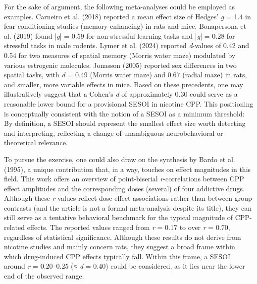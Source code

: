 \documentclass[authordate, meta]{jote-new-article}
\begin{document}
	For the sake of argument, the following meta-analyses could be employed as examples. Carneiro et al. (2018) reported a mean effect size of 	Hedges' \emph{g} = 1.4 in fear conditioning studies (memory-enhancing) in rats and mice. Bonapersona et al. (2019) found |\emph{g}| = 0.59 for non-stressful learning tasks and |\emph{g}| = 0.28 for stressful tasks in male rodents. Lymer et al. (2024) reported \emph{d}-values of 0.42 and 0.54 for two measures of spatial memory (Morris water maze) modulated by various estrogenic molecules. Jonasson (2005) reported sex differences in two spatial tasks, with \emph{d} = 0.49 (Morris water maze) and 0.67 (radial maze) in rats, and smaller, more variable effects in mice. Based on these precedents, one may illustratively suggest that a Cohen's \emph{d} of approximately 0.30 could serve as a reasonable lower bound for a provisional SESOI in nicotine CPP. This positioning is conceptually consistent with the notion of a SESOI as a minimum threshold: By definition, a SESOI should represent the smallest effect size worth detecting and interpreting, reflecting a change of unambiguous neurobehavioral or theoretical relevance.



	To pursue the exercise, one could also draw on the synthesis by Bardo et al. (1995), a unique contribution that, in a way, touches on effect magnitudes in this field. This work offers an overview of point-biserial \emph{r}-correlations between CPP effect amplitudes and the corresponding doses (several) of four addictive drugs. Although these \emph{r}-values reflect dose-effect associations rather than between-group contrasts (and the article is not a formal meta-analysis despite its title), they can still serve as a tentative behavioral benchmark for the typical magnitude of CPP-related effects. The reported values ranged from \emph{r} = 0.17 to over \emph{r} = 0.70, regardless of statistical significance. Although these results do not derive from nicotine studies and mainly concern rats, they suggest a broad frame within which drug-induced CPP effects typically fall. Within this frame, a SESOI around \emph{r} = 0.20--0.25 (≈ \emph{d} = 0.40) could be considered, as it lies near the lower end of the observed range.
\end{document}
